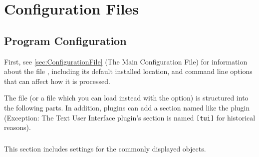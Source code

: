 

\chapter{Configuration Files}
\label{app:ConfigFiles}

\section{Program Configuration}
\label{sec:config.ini}
First, see \ref{sec:ConfigurationFile} (The
Main Configuration File) for information about the file , including its
default installed location, and command line options that can
affect how it is processed.


The file  (or a file which you can load instead with
the  option) is structured into the following
parts. In addition, plugins can add a section named like the plugin
(Exception: The Text User Interface plugin's section is named \texttt{[tui]}
for historical reasons).

\subsection{}

This section includes settings for the commonly displayed objects.

